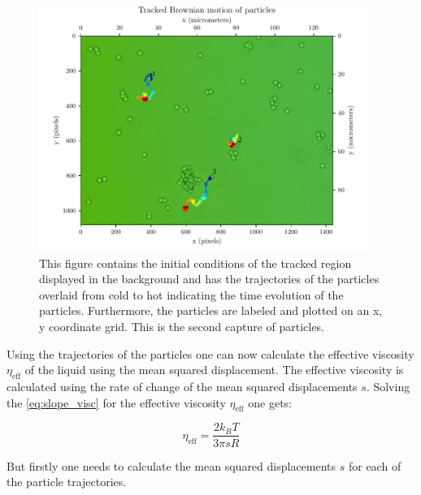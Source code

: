 \documentclass[12pt,english]{scrartcl}
\begin{document}
\begin{figure}[H]
	\centering
	\includegraphics[width=0.95\textwidth]{figures/I2_tracked.pdf}
	\caption[Capture 2 of particles]{This figure contains the initial conditions of the
		tracked region displayed in the background and has the trajectories of the
		particles overlaid from cold to hot indicating the time evolution of the
		particles. Furthermore, the particles are labeled and plotted on an x, y
		coordinate grid. This is the second capture of particles.
	}\label{fig:part_overview_2}
\end{figure}

Using the trajectories of the particles one can now calculate the effective
viscosity $\eta_\text{eff}$ of the liquid using the mean squared displacement.
The effective viscosity is calculated using the rate of change of the mean
squared displacements $s$. Solving the \autoref{eq:slope_visc} for the
effective viscosity $\eta_\text{eff}$ one gets:

\begin{equation}
	\eta_\text{eff} = \frac{2k_B T}{3\pi s R}
	\label{eq:eff_visc}
\end{equation}

But firstly one needs to calculate the mean squared displacements $s$ for each
of the particle trajectories.
\end{document}
